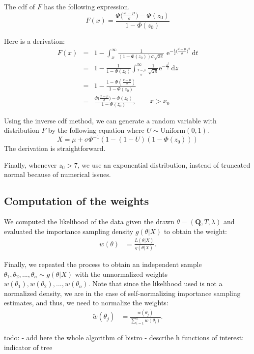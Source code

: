 \documentclass[conference]{IEEEtran}
\begin{document}
The cdf of $F$ has the following expression.
$$
F(x) =
\frac{\Phi\big(\frac{x-\mu}{\sigma}\big)-\Phi(z_0)}{1-\Phi(z_0)}
$$

Here is a derivation:
\begin{eqnarray*}
F(x) & = & 1 - \int_x^\infty \frac{1}{(1 - \Phi(z_0))\sigma\sqrt{2\pi}}\;
\mathrm{e}^{-\frac{1}{2}\big(\frac{t-\mu}{\sigma}\big)^2} \,\mathrm{d}t \\
& = & 1 - \frac{1}{1 - \Phi(z_0)}
\int_{\frac{x-\mu}{\sigma}}^\infty \frac{1}{\sqrt{2\pi}}
\mathrm{e}^{-\frac{z^2}{2}}\, \mathrm{d}z \\
& = & 1 - \frac{1 - \Phi(\frac{x-\mu}{\sigma})}{1 - \Phi(z_0)} \\
& = & \frac{\Phi\big(\frac{x-\mu}{\sigma}\big)-\Phi(z_0)}{1-\Phi(z_0)}, \qquad x > x_0
\end{eqnarray*}

Using the inverse cdf method, we can generate a random variable with distribution $F$
by the following equation where $U \sim \text{Uniform}(0,1)$.
$$
X = \mu + \sigma \Phi^{-1}( 1 - (1-U)(1-\Phi(z_0)))
$$
The derivation is straightforward.

Finally, whenever $z_0>7$, we use an exponential distribution, instead
of truncated normal because of numerical issues.

\subsection*{Computation of the weights}
We computed the likelihood of the data given the drawn $\theta = (\mathbf{Q}, T,
\lambda)$ and evaluated the importance sampling density $g(\theta|X)$
to obtain the weight:
\begin{align*}
w(\theta) &= \frac{L(\theta|X)}{g(\theta|X)}.
\end{align*}

Finally, we repeated the process to obtain an independent sample
$\theta_1, \theta_2,...,\theta_n \sim g(\theta|X)$ with the
unnormalized weights $w(\theta_1), w(\theta_2),...,w(\theta_n)$. Note
that since the likelihood used is not a normalized density, we are in
the case of self-normalizing importance sampling estimates, and thus,
we need to normalize the weights:
\begin{align*}
\tilde{w}(\theta_j) &= \frac{w(\theta_j)}{\sum_{i=1}^n w(\theta_i)}.
\end{align*}


todo:
- add here the whole algorithm of bistro
- describe h functions of interest: indicator of tree
\end{document}
